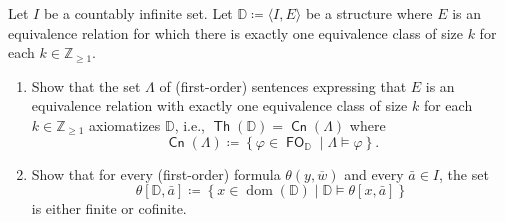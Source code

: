 \documentclass[10pt,letterpaper,cm]{nupset}
\theoremstyle{definition}
\theoremstyle{theorem}
\theoremstyle{remark}
\newcommand{\D}{\mathbb D}
\newcommand{\Z}{\mathbb Z}
\newcommand{\1}{\mathbb{1}}
\newcommand{\0}{\vec 0}
\DeclareMathOperator{\dom}{dom}
\DeclareMathOperator{\thh}{\mathsf{Th}}
\DeclareMathOperator{\cn}{\mathsf{Cn}}
\DeclareMathOperator{\fo}{\mathsf{FO}}
\newcommand{\be}{\begin{enumerate}}
\newcommand{\ee}{\end{enumerate}}
\begin{document}
\begin{problem}[1.] 
Let $I$ be a countably infinite set. Let $\D \coloneqq \langle I, E\rangle$ be a structure where $E$ is an equivalence relation for which  there is exactly one equivalence class of size $k$ for each $k\in \Z_{\geq 1}$.
\be[label=(\arabic*)]
\item Show that the set $\Lambda$ of (first-order) sentences expressing that $E$ is an equivalence relation with exactly one equivalence class of size $k$ for each $k\in \Z_{\geq 1}$ axiomatizes $\D$, i.e., $\thh(\D) = \cn(\Lambda)$ where 
\[
\cn(\Lambda) \coloneqq  \left\{\varphi \in \fo_{\D} \mid \Lambda \models \varphi\right\}
.\]
\item Show that for every (first-order) formula $\theta(y, \overline{w})$ and every $\bar{a}\in I$, the set $$\theta\left[\D, \bar{a}\right] \coloneqq \left\{x\in \dom(\D) \mid \D\models \theta\left[x, \bar{a}\right]\right\}$$ is either finite or cofinite.
\ee
\end{problem}
\end{document}
